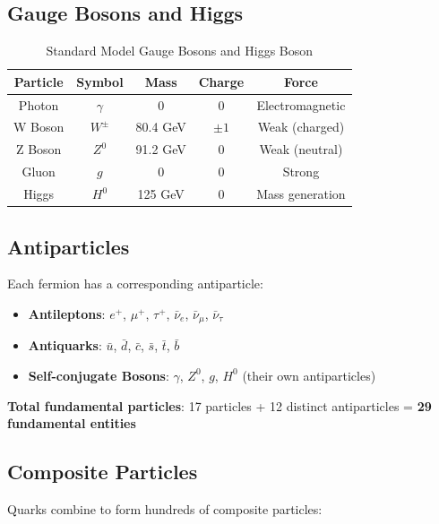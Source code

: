 	\subsection{Gauge Bosons and Higgs}
	
	\begin{table}[htbp]
		\centering
		\begin{tabular}{|c|c|c|c|c|}
			\hline
			\textbf{Particle} & \textbf{Symbol} & \textbf{Mass} & \textbf{Charge} & \textbf{Force} \\
			\hline
			\hline
			Photon & $\gamma$ & 0 & 0 & Electromagnetic \\
			W Boson & $W^{\pm}$ & 80.4 GeV & $\pm 1$ & Weak (charged) \\
			Z Boson & $Z^0$ & 91.2 GeV & 0 & Weak (neutral) \\
			Gluon & $g$ & 0 & 0 & Strong \\
			Higgs & $H^0$ & 125 GeV & 0 & Mass generation \\
			\hline
		\end{tabular}
		\caption{Standard Model Gauge Bosons and Higgs Boson}
		\label{tab:sm_bosons}
	\end{table}
	
	\subsection{Antiparticles}
	
	Each fermion has a corresponding antiparticle:
	
	\begin{itemize}
		\item \textbf{Antileptons}: $e^+$, $\mu^+$, $\tau^+$, $\bar{\nu}_e$, $\bar{\nu}_\mu$, $\bar{\nu}_\tau$
		\item \textbf{Antiquarks}: $\bar{u}$, $\bar{d}$, $\bar{c}$, $\bar{s}$, $\bar{t}$, $\bar{b}$
		\item \textbf{Self-conjugate Bosons}: $\gamma$, $Z^0$, $g$, $H^0$ (their own antiparticles)
	\end{itemize}
	
	\textbf{Total fundamental particles}: 17 particles + 12 distinct antiparticles = \textbf{29 fundamental entities}
	
	\subsection{Composite Particles}
	
	Quarks combine to form hundreds of composite particles:
	

